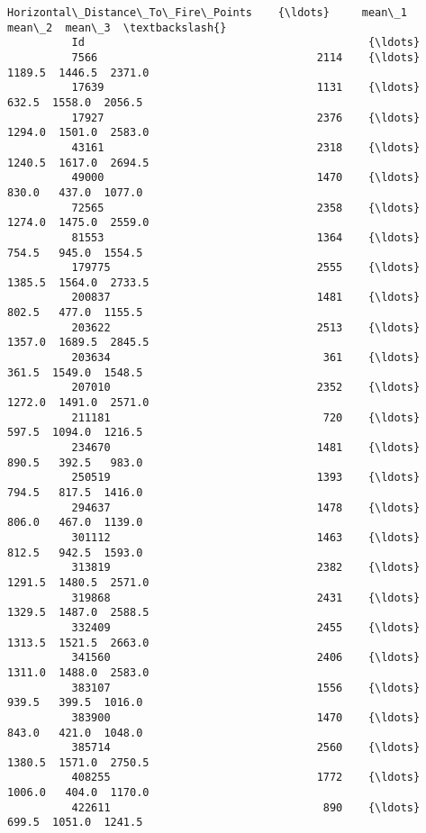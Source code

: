 \documentclass[11pt]{article}
\begin{document}
\begin{Verbatim}[commandchars=\\\{\}]
                  Horizontal\_Distance\_To\_Fire\_Points    {\ldots}     mean\_1  mean\_2  mean\_3  \textbackslash{}
          Id                                            {\ldots}                              
          7566                                  2114    {\ldots}     1189.5  1446.5  2371.0   
          17639                                 1131    {\ldots}      632.5  1558.0  2056.5   
          17927                                 2376    {\ldots}     1294.0  1501.0  2583.0   
          43161                                 2318    {\ldots}     1240.5  1617.0  2694.5   
          49000                                 1470    {\ldots}      830.0   437.0  1077.0   
          72565                                 2358    {\ldots}     1274.0  1475.0  2559.0   
          81553                                 1364    {\ldots}      754.5   945.0  1554.5   
          179775                                2555    {\ldots}     1385.5  1564.0  2733.5   
          200837                                1481    {\ldots}      802.5   477.0  1155.5   
          203622                                2513    {\ldots}     1357.0  1689.5  2845.5   
          203634                                 361    {\ldots}      361.5  1549.0  1548.5   
          207010                                2352    {\ldots}     1272.0  1491.0  2571.0   
          211181                                 720    {\ldots}      597.5  1094.0  1216.5   
          234670                                1481    {\ldots}      890.5   392.5   983.0   
          250519                                1393    {\ldots}      794.5   817.5  1416.0   
          294637                                1478    {\ldots}      806.0   467.0  1139.0   
          301112                                1463    {\ldots}      812.5   942.5  1593.0   
          313819                                2382    {\ldots}     1291.5  1480.5  2571.0   
          319868                                2431    {\ldots}     1329.5  1487.0  2588.5   
          332409                                2455    {\ldots}     1313.5  1521.5  2663.0   
          341560                                2406    {\ldots}     1311.0  1488.0  2583.0   
          383107                                1556    {\ldots}      939.5   399.5  1016.0   
          383900                                1470    {\ldots}      843.0   421.0  1048.0   
          385714                                2560    {\ldots}     1380.5  1571.0  2750.5   
          408255                                1772    {\ldots}     1006.0   404.0  1170.0   
          422611                                 890    {\ldots}      699.5  1051.0  1241.5   

\end{Verbatim}
\end{document}
